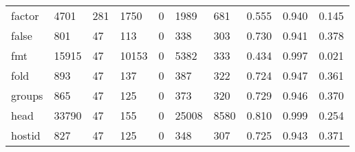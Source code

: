 \begin{longtable}{lp{1.3cm}p{1.3cm}p{1.3cm}p{1.3cm}p{1.3cm}p{1.3cm}p{1.3cm}p{1.3cm}p{1.3cm}}
factor    &                   4701 &                                281 &                              1750 &                                0 &                              1989 &                             681 &                                   0.555 &                                  0.940 &                                0.145 \\
false     &                    801 &                                 47 &                               113 &                                0 &                               338 &                             303 &                                   0.730 &                                  0.941 &                                0.378 \\
fmt       &                  15915 &                                 47 &                             10153 &                                0 &                              5382 &                             333 &                                   0.434 &                                  0.997 &                                0.021 \\
fold      &                    893 &                                 47 &                               137 &                                0 &                               387 &                             322 &                                   0.724 &                                  0.947 &                                0.361 \\
groups    &                    865 &                                 47 &                               125 &                                0 &                               373 &                             320 &                                   0.729 &                                  0.946 &                                0.370 \\
head      &                  33790 &                                 47 &                               155 &                                0 &                             25008 &                            8580 &                                   0.810 &                                  0.999 &                                0.254 \\
hostid    &                    827 &                                 47 &                               125 &                                0 &                               348 &                             307 &                                   0.725 &                                  0.943 &                                0.371 \\

\end{longtable}
